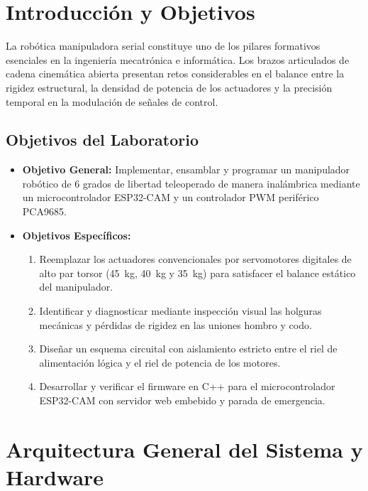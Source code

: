 \documentclass[11pt,a4paper]{article}
\begin{document}
\newpage

\section{Introducción y Objetivos}

La robótica manipuladora serial constituye uno de los pilares formativos esenciales en la ingeniería mecatrónica e informática. Los brazos articulados de cadena cinemática abierta presentan retos considerables en el balance entre la rigidez estructural, la densidad de potencia de los actuadores y la precisión temporal en la modulación de señales de control.

\subsection{Objetivos del Laboratorio}
\begin{itemize}
    \item \textbf{Objetivo General:} Implementar, ensamblar y programar un manipulador robótico de 6 grados de libertad teleoperado de manera inalámbrica mediante un microcontrolador ESP32-CAM y un controlador PWM periférico PCA9685.
    \item \textbf{Objetivos Específicos:}
    \begin{enumerate}
        \item Reemplazar los actuadores convencionales por servomotores digitales de alto par torsor (45~kg, 40~kg y 35~kg) para satisfacer el balance estático del manipulador.
        \item Identificar y diagnosticar mediante inspección visual las holguras mecánicas y pérdidas de rigidez en las uniones hombro y codo.
        \item Diseñar un esquema circuital con aislamiento estricto entre el riel de alimentación lógica y el riel de potencia de los motores.
        \item Desarrollar y verificar el firmware en C++ para el microcontrolador ESP32-CAM con servidor web embebido y parada de emergencia.
    \end{enumerate}
\end{itemize}

\section{Arquitectura General del Sistema y Hardware}
\end{document}
